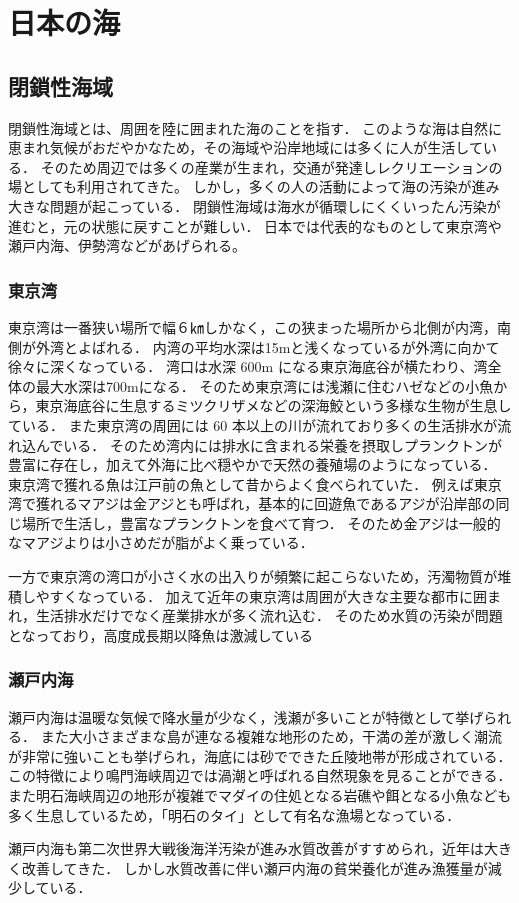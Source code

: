 \documentclass[12pt,a4j,titlepage]{ltjsarticle}
\begin{document}
\section{日本の海}\label{海}
\subsection{閉鎖性海域}
閉鎖性海域とは、周囲を陸に囲まれた海のことを指す．
このような海は自然に恵まれ気候がおだやかなため，その海域や沿岸地域には多くに人が生活している．
そのため周辺では多くの産業が生まれ，交通が発達しレクリエーションの場としても利用されてきた。
しかし，多くの人の活動によって海の汚染が進み大きな問題が起こっている．
閉鎖性海域は海水が循環しにくくいったん汚染が進むと，元の状態に戻すことが難しい．
日本では代表的なものとして東京湾や瀬戸内海、伊勢湾などがあげられる。
\subsubsection{東京湾}
東京湾は一番狭い場所で幅６㎞しかなく，この狭まった場所から北側が内湾，南側が外湾とよばれる\cite{toukyouwan}．
内湾の平均水深は15mと浅くなっているが外湾に向かて徐々に深くなっている．
湾口は水深 600m になる東京海底谷が横たわり、湾全体の最大水深は700mになる．
そのため東京湾には浅瀬に住むハゼなどの小魚から，東京海底谷に生息するミツクリザメなどの深海鮫という多様な生物が生息している．
また東京湾の周囲には 60 本以上の川が流れており多くの生活排水が流れ込んでいる．
そのため湾内には排水に含まれる栄養を摂取しプランクトンが豊富に存在し，加えて外海に比べ穏やかで天然の養殖場のようになっている．
東京湾で獲れる魚は江戸前の魚として昔からよく食べられていた．
例えば東京湾で獲れるマアジは金アジとも呼ばれ，基本的に回遊魚であるアジが沿岸部の同じ場所で生活し，豊富なプランクトンを食べて育つ．
そのため金アジは一般的なマアジよりは小さめだが脂がよく乗っている\cite{toyoumi}．\par
一方で東京湾の湾口が小さく水の出入りが頻繁に起こらないため，汚濁物質が堆積しやすくなっている．
加えて近年の東京湾は周囲が大きな主要な都市に囲まれ，生活排水だけでなく産業排水が多く流れ込む．
そのため水質の汚染が問題となっており，高度成長期以降魚は激減している
\subsubsection{瀬戸内海}
瀬戸内海は温暖な気候で降水量が少なく，浅瀬が多いことが特徴として挙げられる．
また大小さまざまな島が連なる複雑な地形のため，干満の差が激しく潮流が非常に強いことも挙げられ，海底には砂でできた丘陵地帯が形成されている．
この特徴により鳴門海峡周辺では渦潮と呼ばれる自然現象を見ることができる．
また明石海峡周辺の地形が複雑でマダイの住処となる岩礁や餌となる小魚なども多く生息しているため，「明石のタイ」として有名な漁場となっている．\par
瀬戸内海も第二次世界大戦後海洋汚染が進み水質改善がすすめられ，近年は大きく改善してきた\cite{setouti}．
しかし水質改善に伴い瀬戸内海の貧栄養化が進み漁獲量が減少している．
\end{document}
